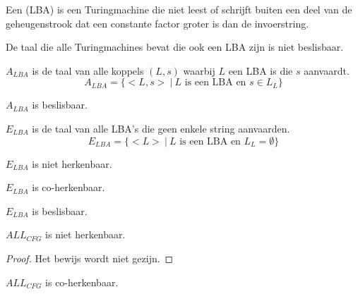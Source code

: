 \documentclass[main.tex]{subfiles}
\begin{document}
\begin{de}
  Een  (LBA) is een Turingmachine die niet leest of schrijft buiten een deel van de geheugenstrook dat een constante factor groter is dan de invoerstring.
\end{de}

\begin{st}
  De taal die alle Turingmachines bevat die ook een LBA zijn is niet beslisbaar.
\end{st}

\begin{de}
  \label{de:a-lba}
  $A_{LBA}$ is de taal van alle koppels $(L,s)$ waarbij $L$ een LBA is die $s$ aanvaardt.
  \[ A_{LBA} = \{ <L,s> \ |\ L \text{ is een LBA en } s \in L_{L}\} \]
\end{de}

\begin{st}
  $A_{LBA}$ is beslisbaar.
\end{st}

\begin{de}
  \label{de:e-lba}
  $E_{LBA}$ is de taal van alle LBA's die geen enkele string aanvaarden.
  \[ E_{LBA} = \{ <L> \ |\ L \text{ is een LBA en } L_{L} = \emptyset \} \]
\end{de}

\begin{st}
  $E_{LBA}$ is niet herkenbaar.
\end{st}

\begin{st}
  $E_{LBA}$ is co-herkenbaar.
\end{st}

\begin{gev}
  $E_{LBA}$ is beslisbaar.
\end{gev}


\begin{st}
  $ALL_{CFG}$ is niet herkenbaar.
  \begin{proof}
    Het bewijs wordt niet gezijn.
  \end{proof}
\end{st}

\begin{st}
  $ALL_{CFG}$ is co-herkenbaar.
\end{st}
\end{document}
